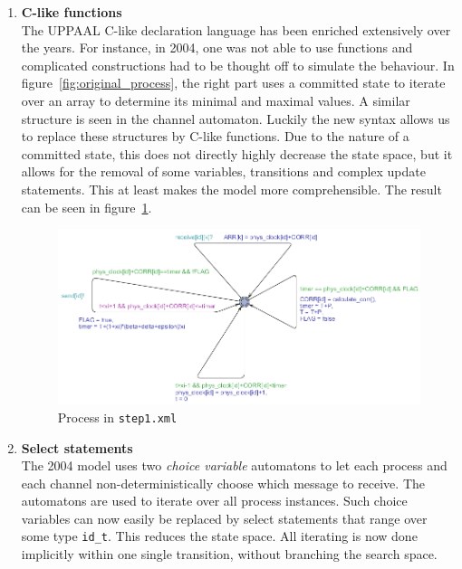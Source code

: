 \documentclass[a4paper,10pt]{article}
\newcommand{\UPPAAL}{UPPAAL\xspace}
\begin{document}
\begin{enumerate}
\item \textbf{C-like functions} \\
	The \UPPAAL C-like declaration language has been enriched extensively over the years. For instance, in 2004, one was not able to use functions and complicated constructions had to be thought off to simulate the behaviour. In figure~\ref{fig:original_process}, the right part uses a committed state to iterate over an array to determine its minimal and maximal values. A similar structure is seen in the channel automaton. Luckily the new syntax allows us to replace these structures by C-like functions. Due to the nature of a committed state, this does not directly highly decrease the state space, but it allows for the removal of some variables, transitions and complex update statements. This at least makes the model more comprehensible. The result can be seen in figure~\ref{fig:step1_process}.

\begin{figure}[!h]
\includegraphics[width=\textwidth]{step1_process}
\caption{Process in \texttt{step1.xml}\label{fig:step1_process}}
\end{figure}

\item \textbf{Select statements} \\
	The 2004 model uses two \textit{choice variable} automatons to let each process and each channel non-deterministically choose which message to receive. The automatons are used to iterate over all process instances. Such choice variables can now easily be replaced by select statements that range over some type \texttt{id\_t}. This reduces the state space. All iterating is now done implicitly within one single transition, without branching the search space.


\end{enumerate}
\end{document}
